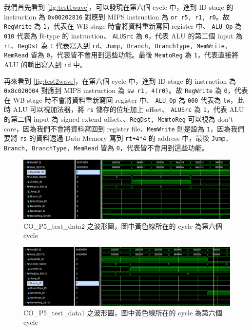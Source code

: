 \documentclass[twocolumn]{extarticle}
\begin{document}
我們首先看到 \autoref{fig:test1wave}，可以發現在第六個 cycle 中，進到 ID stage 的 instruction 為 \texttt{0x00202816} 對應到 MIPS instruction 為 \texttt{or r5, r1, r0}。故 \texttt{RegWrite} 為 \texttt{1}，代表在 WB stage 時會將資料重新寫回 register 中、 \texttt{ALU\_Op} 為 \texttt{010} 代表為 R-type 的 instruction、 \texttt{ALUSrc} 為 \texttt{0}，代表 ALU 的第二個 input 為 \texttt{rt}、\texttt{RegDst} 為 \texttt{1} 代表寫入到 \texttt{rd}、\texttt{Jump, Branch, BranchType, MemWrite, MemRead} 皆為 \texttt{0}，代表皆不會用到這些功能。最後 \texttt{MemtoReg} 為 \texttt{1}，代表直接將 ALU 的輸出寫入到 \texttt{rd} 中。

再來看到 \autoref{fig:test2wave}，在第六個 cycle 中，進到 ID stage 的 instruction 為 \texttt{0x8c020004} 對應到 MIPS instruction 為 \texttt{sw r1, 4(r0)}。故 \texttt{RegWrite} 為 \texttt{0}，代表在 WB stage 時不會將資料重新寫回 register 中、 \texttt{ALU\_Op} 為 \texttt{000} 代表為 \texttt{lw}，此時 ALU 可以視加法器，將 \texttt{rs} 儲存的位址加上 offset、 \texttt{ALUSrc} 為 \texttt{1}，代表 ALU 的第二個 input 為 signed extend offset、、\texttt{RegDst, MemtoReg} 可以視為 don't care，因為我們不會將資料寫回到 register file、\texttt{MemWrite} 則是設為 \texttt{1}，因為我們要將 \texttt{rs} 的資料透過 Data Memory 寫到 \texttt{rt+4*4} 的 address 中，最後 \texttt{Jump, Branch, BranchType, MemRead} 皆為 \texttt{0}，代表皆不會用到這些功能。


\begin{figure}[H]
\centering
\includegraphics[width=\linewidth]{test1_wave}
\caption{CO\_P5\_test\_data2 之波形圖，圖中黃色線所在的 cycle 為第六個 cycle}
\label{fig:test1wave}
\end{figure}

\begin{figure}[H]
\centering
\includegraphics[width=\linewidth]{test2_wave}
\caption{CO\_P5\_test\_data1 之波形圖，圖中黃色線所在的 cycle 為第六個 cycle}
\label{fig:test2wave}
\end{figure}
\end{document}
